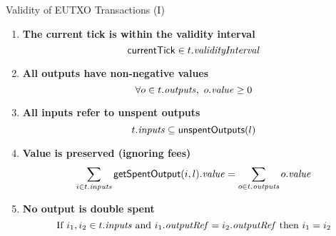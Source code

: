 \begin{frame}{Validity of EUTXO Transactions (I)}

\begin{enumerate}
\item
  \label{rule:tick-in-range}
  \textbf{The current tick is within the validity interval}
  \begin{displaymath}
    \mathsf{currentTick} \in t.\mathit{validityInterval}
  \end{displaymath}

\item
  \label{rule:all-outputs-are-non-negative}
  \textbf{All outputs have non-negative values}
  \begin{displaymath}
    \forall o \in t.\mathit{outputs},\ o.\mathit{value} \geq 0
  \end{displaymath}

\item
  \label{rule:all-inputs-refer-to-unspent-outputs}
  \textbf{All inputs refer to unspent outputs}
  \begin{displaymath}
    t.\mathit{inputs} \subseteq \mathsf{unspentOutputs}(l)
  \end{displaymath}

\item
  \label{rule:value-is-preserved}
  \textbf{Value is preserved (ignoring fees)}
  \begin{displaymath}
    \sum_{i \in t.\mathit{inputs}} \mathsf{getSpentOutput}(i, l).\mathit{value} = \sum_{o \in t.\mathit{outputs}} o.\mathit{value}
  \end{displaymath}

\item
  \label{rule:no-double-spending}
  \textbf{No output is double spent}
  \begin{displaymath}
    \textrm{If } i_1, i_2 \in t.\mathit{inputs} \textrm{ and }  i_1.\mathit{outputRef} = i_2.\mathit{outputRef}
    \textrm{ then } i_1 = i_2
  \end{displaymath}

\seti
\end{enumerate}

\end{frame}


